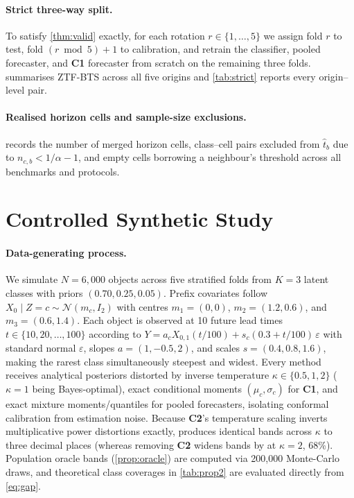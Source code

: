 \paragraph{Strict three-way split.}
To satisfy \cref{thm:valid} exactly, for each rotation $r\in\{1,\dots,5\}$ we assign fold $r$ to test, fold $(r\bmod 5)+1$ to calibration, and retrain the classifier, pooled forecaster, and \textbf{C1} forecaster from scratch on the remaining three folds.
 summarises ZTF-BTS across all five origins and \cref{tab:strict} reports every origin--level pair.
\FloatBarrier

\FloatBarrier

\paragraph{Realised horizon cells and sample-size exclusions.}
 records the number of merged horizon cells, class--cell pairs excluded from $\hat t_b$ due to $n_{c,b}<1/\alpha-1$, and empty cells borrowing a neighbour's threshold across all benchmarks and protocols.
\FloatBarrier

\FloatBarrier

\FloatBarrier
\section{Controlled Synthetic Study}
\label{app:synthetic}
\paragraph{Data-generating process.}
We simulate $N=6{,}000$ objects across five stratified folds from $K=3$ latent classes with priors $(0.70,0.25,0.05)$.
Prefix covariates follow $X_0\mid Z=c\sim\mathcal N(m_c,I_2)$ with centres $m_1=(0,0)$, $m_2=(1.2,0.6)$, and $m_3=(0.6,1.4)$.
Each object is observed at 10 future lead times $t\in\{10,20,\dots,100\}$ according to $Y=a_c X_{0,1}(t/100)+s_c(0.3+t/100)\,\varepsilon$ with standard normal $\varepsilon$, slopes $a=(1,-0.5,2)$, and scales $s=(0.4,0.8,1.6)$, making the rarest class simultaneously steepest and widest.
Every method receives analytical posteriors distorted by inverse temperature $\kappa\in\{0.5,1,2\}$ ($\kappa=1$ being Bayes-optimal), exact conditional moments $(\mu_c,\sigma_c)$ for \textbf{C1}, and exact mixture moments/quantiles for pooled forecasters, isolating conformal calibration from estimation noise.
Because \textbf{C2}'s temperature scaling inverts multiplicative power distortions exactly, \gamut{} produces identical bands across $\kappa$ to three decimal places (whereas removing \textbf{C2} widens bands by \AblRawKtwoSixtyeight{} at $\kappa=2$, 68\%).
Population oracle bands (\cref{prop:oracle}) are computed via 200,000 Monte-Carlo draws, and theoretical class coverages in \cref{tab:prop2} are evaluated directly from \cref{eq:gap}.
\FloatBarrier

\FloatBarrier

